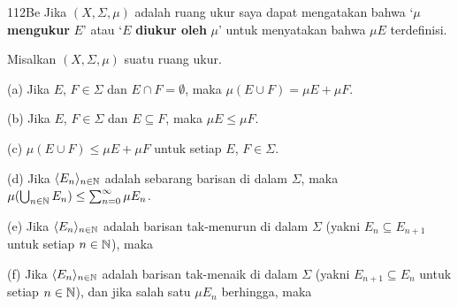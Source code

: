 \spheader 112Be Jika $(X,\Sigma,\mu)$ adalah ruang ukur saya dapat mengatakan bahwa `$\mu$
{\bf mengukur} $E$' atau `$E$ {\bf diukur oleh} $\mu$' untuk menyatakan
bahwa $\mu E$ terdefinisi. 

 Misalkan
$(X,\Sigma,\mu)$ suatu ruang ukur.

(a) Jika $E$, $F\in\Sigma$ dan $E\cap F=\emptyset$, maka
$\mu(E\cup F)=\mu E+\mu F$.

(b) Jika $E$, $F\in\Sigma$ dan $E\subseteq F$, maka $\mu E\le \mu F$.

(c) $\mu(E\cup F)\le\mu E+\mu F$ untuk setiap $E$, $F\in\Sigma$.

(d) Jika $\langle E_n\rangle_{n\in\Bbb N}$ adalah sebarang barisan di
dalam $\Sigma$, maka
$\mu(\bigcup_{n\in\Bbb N}E_n)\le\sum_{n=0}^{\infty}\mu E_n$.

(e) Jika $\langle E_n\rangle_{n\in\Bbb N}$ adalah barisan
tak-menurun di dalam $\Sigma$ (yakni $E_n\subseteq E_{n+1}$ untuk
setiap $n\in\Bbb N$), maka


(f) Jika $\langle E_n\rangle_{n\in\Bbb N}$ adalah barisan tak-menaik
di dalam $\Sigma$ (yakni $E_{n+1}\subseteq E_{n}$ untuk setiap
$n\in\Bbb N$), dan jika salah satu $\mu E_n$ berhingga, maka


